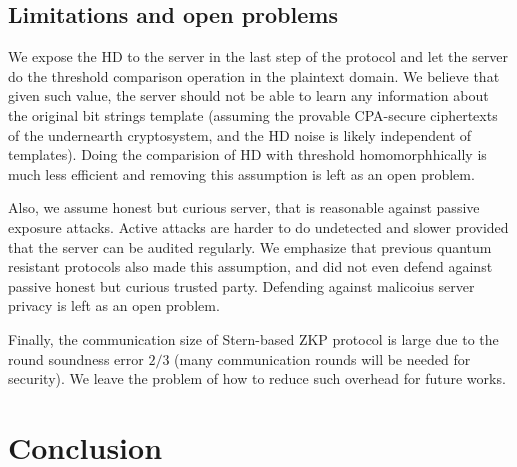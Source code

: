 \subsection{Limitations and open problems}
\label{sec:limitations}
We expose the HD to the server in the last step of the protocol and let the server do the threshold comparison
operation in the plaintext domain. We believe that given such value, the server should not be able to learn any
information about the original bit strings template (assuming the provable CPA-secure ciphertexts of the undernearth
cryptosystem, and the HD noise is likely independent of templates). Doing the comparision of HD with threshold
homomorphhically is much less efficient and removing this assumption is left as an open problem.

Also, we assume honest but curious server, that is reasonable against passive exposure attacks. Active attacks are
harder to do undetected and slower provided that the server can be audited regularly. We emphasize that previous quantum
resistant protocols also made this assumption, and did not even defend against passive honest but curious trusted
party. Defending against malicoius server privacy is left as an open problem.

Finally, the communication size of Stern-based ZKP protocol is large due to the round soundness error \(2/3\) (many
communication rounds will be needed for security). We leave the problem of how to reduce such overhead for future works.



\section{Conclusion}
\label{sec:firstProcResults}




